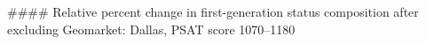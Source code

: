 #### Relative percent change in first-generation status composition after excluding Geomarket: Dallas, PSAT score 1070–1180
